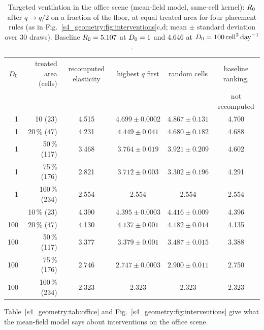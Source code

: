 \begin{table}[tbp]
  \centering
  \caption{Targeted ventilation in the office scene (mean-field model, same-cell kernel): $R_0$ after
  $q\to q/2$ on a fraction of the floor, at equal treated area for four placement rules (as in
  Fig.~\ref{s4_geometry:fig:interventions}c,d; mean $\pm$ standard deviation over $30$ draws). Baseline
  $R_0=5.107$ at $D_0=1$ and $4.646$ at $D_0=100\,\mathrm{cell}^2\,\mathrm{day}^{-1}$.}
  \label{s4_geometry:tab:targeting}
  \footnotesize
  \setlength{\tabcolsep}{5pt}
  \begin{tabular}{@{}rrcccc@{}}
    \toprule
    $D_0$ & treated area (cells) & recomputed elasticity & highest $q$ first & random cells & baseline ranking, \\
          &                      &                       &                   &              & not recomputed \\
    \midrule
    1   & 10\pct{} (23)  & 4.515 & $4.699\pm0.0002$ & $4.867\pm0.131$ & 4.700 \\
    1   & 20\,\% (47)  & 4.231 & $4.449\pm0.041$ & $4.680\pm0.182$ & 4.688 \\
    1   & 50\,\% (117) & 3.468 & $3.764\pm0.019$ & $3.921\pm0.209$ & 4.602 \\
    1   & 75\,\% (176) & 2.821 & $3.712\pm0.003$ & $3.302\pm0.196$ & 4.291 \\
    1   & 100\,\% (234) & 2.554 & 2.554 & 2.554 & 2.554 \\
    \addlinespace
    100 & 10\,\% (23)  & 4.390 & $4.395\pm0.0003$ & $4.416\pm0.009$ & 4.396 \\
    100 & 20\,\% (47)  & 4.130 & $4.137\pm0.001$ & $4.182\pm0.014$ & 4.135 \\
    100 & 50\,\% (117) & 3.377 & $3.379\pm0.001$ & $3.487\pm0.015$ & 3.388 \\
    100 & 75\,\% (176) & 2.746 & $2.747\pm0.0003$ & $2.900\pm0.011$ & 2.750 \\
    100 & 100\,\% (234) & 2.323 & 2.323 & 2.323 & 2.323 \\
    \bottomrule
  \end{tabular}
\end{table}

Table~\ref{s4_geometry:tab:office} and Fig.~\ref{s4_geometry:fig:interventions} give what the mean-field model says
about interventions on the office scene.

